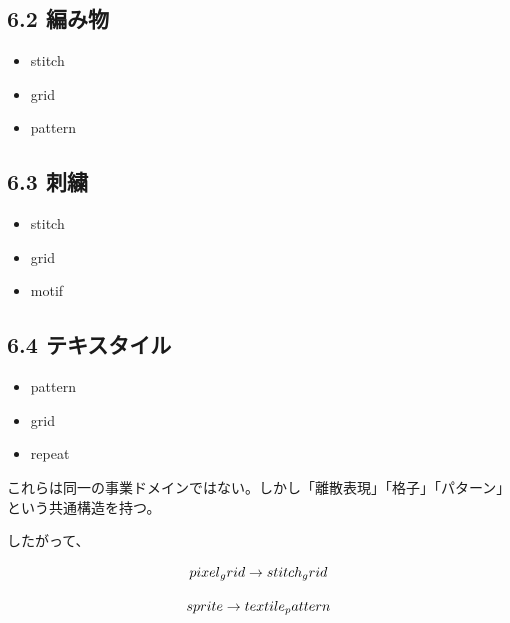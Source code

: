 \documentclass[a4paper,11pt]{jsarticle}
\begin{document}
\subsection{6.2 編み物}
\begin{itemize}
\item stitch
\end{itemize}
\begin{itemize}
\item grid
\end{itemize}
\begin{itemize}
\item pattern
\end{itemize}
\subsection{6.3 刺繍}
\begin{itemize}
\item stitch
\end{itemize}
\begin{itemize}
\item grid
\end{itemize}
\begin{itemize}
\item motif
\end{itemize}
\subsection{6.4 テキスタイル}
\begin{itemize}
\item pattern
\end{itemize}
\begin{itemize}
\item grid
\end{itemize}
\begin{itemize}
\item repeat
\end{itemize}
これらは同一の事業ドメインではない。しかし「離散表現」「格子」「パターン」という共通構造を持つ。


したがって、


\[


pixel\\_grid \rightarrow stitch\\_grid


\]


\[


sprite \rightarrow textile\\_pattern


\]
\end{document}
